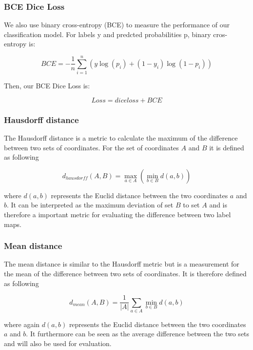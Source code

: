 \subsubsection{BCE Dice Loss}
We also use binary cross-entropy (BCE) to measure the performance of our classification model. For labels y and predcted probabilities p, binary cros-entropy is:

\begin{equation}
BCE = - \frac{1}{n} \sum_{i=1}^{n}(y \log{(p_i)} + (1-y_i)\log{(1-p_i)})
\end{equation} 


Then, our BCE Dice Loss is:

\begin{equation}
Loss =  dice loss + BCE
\end{equation}

\subsubsection{Hausdorff distance}
The Hausdorff distance is a metric to calculate the maximum of the difference between two sets of coordinates.\newline
For the set of coordinates $A$ and $B$ it is defined as following

\begin{equation}
	d_{hausdorff} (A,B) = \max_{a \in A} (\min_{b \in B} d(a,b))
\end{equation} 

where $d(a,b)$ represents the Euclid distance between the two coordinates $a$ and $b$. It can be interpreted as the maximum deviation of set $B$ to set $A$ and is therefore a important metric for evaluating the difference between two label maps.

\subsubsection{Mean distance}
The mean distance is similar to the Hausdorff metric but is a measurement for the mean of the difference between two sets of coordinates.\newline
It is therefore defined as following

\begin{equation}
	d_{mean} (A,B) = \frac{1}{|A|} \sum_{a \in A} \min_{b \in B} d(a,b)
\end{equation}

where again $d(a,b)$ represents the Euclid distance between the two coordinates $a$ and $b$. It furthermore can be seen as the average difference between the two sets and will also be used for evaluation.
